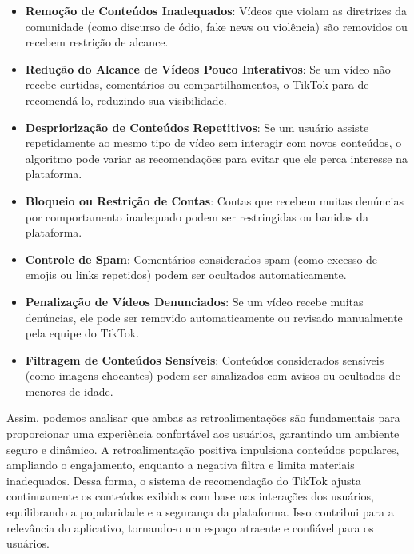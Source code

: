 \begin{itemize}
\item \textbf{Remoção de Conteúdos Inadequados}:
Vídeos que violam as diretrizes da comunidade (como discurso de ódio, fake news ou violência) são removidos ou recebem restrição de alcance.

\item \textbf{Redução do Alcance de Vídeos Pouco Interativos}:
Se um vídeo não recebe curtidas, comentários ou compartilhamentos, o TikTok para de recomendá-lo, reduzindo sua visibilidade.

\item \textbf{Despriorização de Conteúdos Repetitivos}:
Se um usuário assiste repetidamente ao mesmo tipo de vídeo sem interagir com novos conteúdos, o algoritmo pode variar as recomendações para evitar que ele perca interesse na plataforma.

\item \textbf{Bloqueio ou Restrição de Contas}:
Contas que recebem muitas denúncias por comportamento inadequado podem ser restringidas ou banidas da plataforma.

\item \textbf{Controle de Spam}: 
Comentários considerados spam (como excesso de emojis ou links repetidos) podem ser ocultados automaticamente.

\item \textbf{Penalização de Vídeos Denunciados}:
Se um vídeo recebe muitas denúncias, ele pode ser removido automaticamente ou revisado manualmente pela equipe do TikTok.

\item \textbf{Filtragem de Conteúdos Sensíveis}:
Conteúdos considerados sensíveis (como imagens chocantes) podem ser sinalizados com avisos ou ocultados de menores de idade.
\end{itemize}



Assim, podemos analisar que ambas as retroalimentações são fundamentais para proporcionar uma experiência confortável aos usuários, garantindo um ambiente seguro e dinâmico. A retroalimentação positiva impulsiona conteúdos populares, ampliando o engajamento, enquanto a negativa filtra e limita materiais inadequados. Dessa forma, o sistema de recomendação do TikTok ajusta continuamente os conteúdos exibidos com base nas interações dos usuários, equilibrando a popularidade e a segurança da plataforma. Isso contribui para a relevância do aplicativo, tornando-o um espaço atraente e confiável para os usuários.




